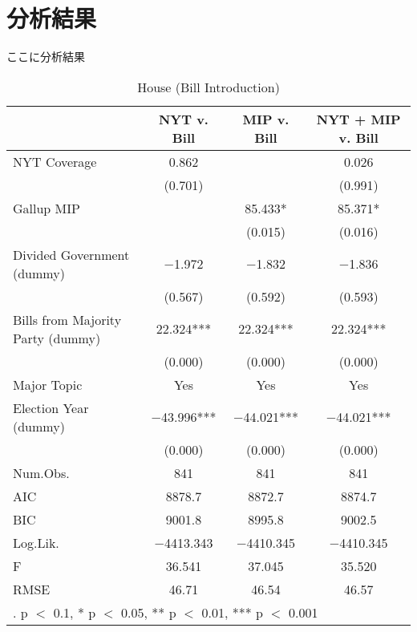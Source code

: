 \documentclass[here]{article}
\begin{document}
\section{分析結果}
ここに分析結果


\begin{table}[]
  \caption{House (Bill Introduction)}
  \hspace{-1cm}

  \begin{tabular}[t]{lccc}
    \toprule
      & NYT v. Bill & MIP v. Bill & NYT + MIP v. Bill\\
    \midrule
    NYT Coverage & \num{0.862} &  & \num{0.026}\\
    & (\num{0.701}) &  & (\num{0.991})\\
    Gallup MIP &  & \num{85.433}* & \num{85.371}*\\
    &  & (\num{0.015}) & (\num{0.016})\\
    Divided Government (dummy) & \num{-1.972} & \num{-1.832} & \num{-1.836}\\
    & (\num{0.567}) & (\num{0.592}) & (\num{0.593})\\
    Bills from Majority Party (dummy) & \num{22.324}*** & \num{22.324}*** & \num{22.324}***\\
    & (\num{0.000}) & (\num{0.000}) & \vphantom{1} (\num{0.000})\\
    Major Topic & Yes & Yes & Yes\\
    Election Year (dummy) & \num{-43.996}*** & \num{-44.021}*** & \num{-44.021}***\\
    & (\num{0.000}) & (\num{0.000}) & (\num{0.000})\\
    Num.Obs. & \num{841} & \num{841} & \num{841}\\
    \midrule
    AIC & \num{8878.7} & \num{8872.7} & \num{8874.7}\\
    BIC & \num{9001.8} & \num{8995.8} & \num{9002.5}\\
    Log.Lik. & \num{-4413.343} & \num{-4410.345} & \num{-4410.345}\\
    F & \num{36.541} & \num{37.045} & \num{35.520}\\
    RMSE & \num{46.71} & \num{46.54} & \num{46.57}\\
    \bottomrule
    \multicolumn{4}{l}{\rule{0pt}{1em}. p $<$ 0.1, * p $<$ 0.05, ** p $<$ 0.01, *** p $<$ 0.001}\\
  \end{tabular}
\end{table}
\end{document}
